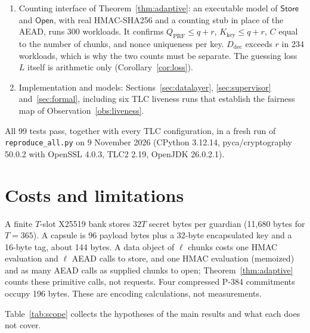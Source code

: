 \documentclass[pdflatex,sn-mathphys-num]{sn-jnl}%
\theoremstyle{plain}
\theoremstyle{definition}
\newcommand{\code}[1]{\texttt{#1}}
\begin{document}
\begin{enumerate}
\item Counting interface of Theorem~\ref{thm:adaptive}: an executable model of $\mathsf{Store}$ and $\mathsf{Open}$, with real HMAC-SHA256 and a counting stub in place of the AEAD, runs 300 workloads. It confirms $Q_{\mathrm{PRF}}\le q+r$, $K_{\mathrm{key}}\le q+r$, $C$ equal to the number of chunks, and nonce uniqueness per key. $D_{\mathrm{dec}}$ exceeds $r$ in 234 workloads, which is why the two counts must be separate. The guessing loss $L$ itself is arithmetic only (Corollary~\ref{cor:loss}).
\item Implementation and models: Sections~\ref{sec:datalayer}, \ref{sec:supervisor} and~\ref{sec:formal}, including six TLC liveness runs that establish the fairness map of Observation~\ref{obs:liveness}.
\end{enumerate}
All 99 tests pass, together with every TLC configuration, in a fresh run of \code{reproduce\_all.py} on 9 November 2026 (CPython 3.12.14, pyca/cryptography 50.0.2 with OpenSSL 4.0.3, TLC2 2.19, OpenJDK 26.0.2.1).


\section{Costs and limitations}\label{sec:limits}

A finite $T$-slot X25519 bank stores $32T$ secret bytes per guardian (11,680 bytes for $T=365$). A capsule is 96 payload bytes plus a 32-byte encapsulated key and a 16-byte tag, about 144 bytes. A data object of $\ell$ chunks costs one HMAC evaluation and $\ell$ AEAD calls to store, and one HMAC evaluation (memoized) and as many AEAD calls as supplied chunks to open; Theorem~\ref{thm:adaptive} counts these primitive calls, not requests. Four compressed P-384 commitments occupy 196 bytes. These are encoding calculations, not measurements.

Table~\ref{tab:scope} collects the hypotheses of the main results and what each does not cover.
\end{document}
